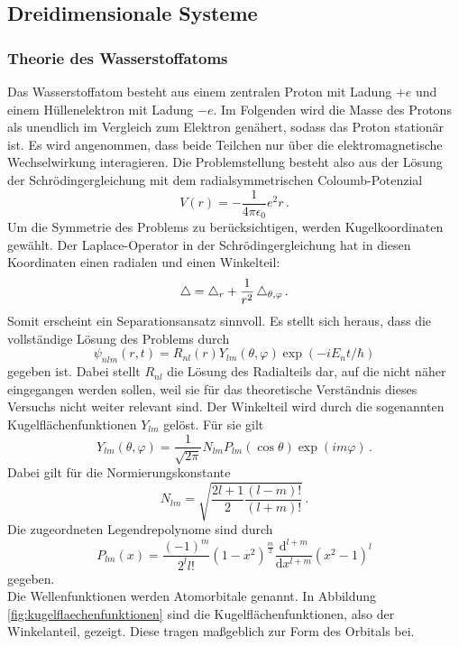 \subsection{Dreidimensionale Systeme}
\label{subsec:dreidimsyst}

\subsubsection{Theorie des Wasserstoffatoms}
\label{subsubsec:hatom}
Das Wasserstoffatom besteht aus einem zentralen Proton mit Ladung $+e$ und einem Hüllenelektron mit Ladung $-e$. Im Folgenden wird die Masse des Protons als unendlich im Vergleich zum Elektron genähert, sodass das Proton stationär ist. Es wird angenommen, dass beide Teilchen nur über die elektromagnetische Wechselwirkung interagieren. Die Problemstellung besteht also aus der Lösung der Schrödingergleichung mit dem radialsymmetrischen Coloumb-Potenzial
\begin{equation}
  V(r) = - \frac{1}{4 \pi \epsilon_0}{e^2}{r}\,.
  \label{eqn:coloumb}
\end{equation}
Um die Symmetrie des Problems zu berücksichtigen, werden Kugelkoordinaten gewählt. Der Laplace-Operator in der Schrödingergleichung hat in diesen Koordinaten einen radialen und einen Winkelteil:
\begin{equation}
  \mathop{}\!\mathbin\bigtriangleup = \mathop{}\!\mathbin\bigtriangleup_r + \frac{1}{r^2} \mathop{}\!\mathbin\bigtriangleup_{\theta, \varphi}\,.
  \label{eqn:laplaceWinkel}
\end{equation}
Somit erscheint ein Separationsansatz sinnvoll. Es stellt sich heraus, dass die vollständige Lösung des Problems durch
\begin{equation}
  \psi_{nlm}(r,t) = R_{nl}(r) Y_{lm}(\theta, \varphi) \exp(-i E_n t / \hbar)
  \label{eqn:hatomloesung}
\end{equation}
gegeben ist. Dabei stellt $R_{nl}$ die Lösung des Radialteils dar, auf die nicht näher eingegangen werden sollen, weil sie für das theoretische Verständnis dieses Versuchs nicht weiter relevant sind. Der Winkelteil wird durch die sogenannten Kugelflächenfunktionen $Y_{lm}$ gelöst. Für sie gilt
\begin{equation}
  Y_{lm}(\theta,\varphi) = \frac{1}{\sqrt{2\pi}} N_{lm} P_{lm}(\cos\theta) \exp(im\varphi)\,.
  \label{eqn:kugelflaechenfunktionen}
\end{equation}
Dabei gilt für die Normierungskonstante
\begin{equation}
  N_{lm} = \sqrt{\frac{2l+1}{2} \frac{(l-m)!}{(l+m)!}}\,.
  \label{eqn:ylmnormierung}
\end{equation}
Die zugeordneten Legendrepolynome sind durch
\begin{equation}
  P_{lm}(x) = \frac{(-1)^m}{2^l l!} (1-x^2)^{\frac{m}{2}} \frac{\mathrm{d}^{l+m}}{\mathrm{d}x^{l+m}} (x^2-1)^l
  \label{eqn:zugeordneteLegendrepolynome}
\end{equation}
gegeben.\\
Die Wellenfunktionen werden Atomorbitale genannt. In Abbildung \ref{fig:kugelflaechenfunktionen} sind die Kugelflächenfunktionen, also der Winkelanteil, gezeigt. Diese tragen maßgeblich zur Form des Orbitals bei.

